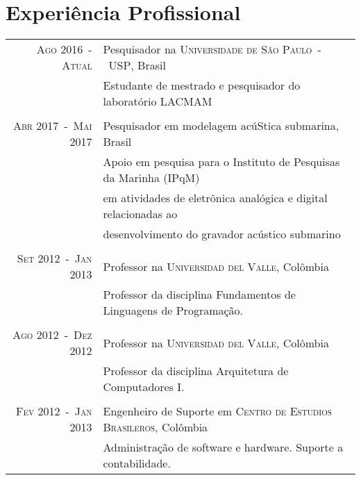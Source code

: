 \documentclass[a4paper,10pt]{article}
\begin{document}
\section{Experiência Profissional}
\begin{longtable}{rl}

    \textsc{Ago 2016~-~Atual}       & Pesquisador na \textsc{Universidade de São Paulo~-~USP}, Brasil \\
                                    &\footnotesize{Estudante de mestrado e pesquisador do laboratório LACMAM} \\
                                    &\\

    \textsc{Abr 2017~-~Mai 2017}    & Pesquisador em modelagem acúStica submarina, Brasil \\
                                    &\footnotesize{Apoio em pesquisa para o Instituto de Pesquisas da Marinha (IPqM)} \\
                                    &\footnotesize{em atividades de eletrônica analógica e digital relacionadas ao} \\
                                    &\footnotesize{desenvolvimento do gravador acústico submarino} \\
                                    &\\

    \textsc{Set 2012~-~Jan 2013}    & Professor na \textsc{Universidad del Valle}, Colômbia \\
                                    &\footnotesize{Professor da disciplina Fundamentos de Linguagens de Programação.} \\
                                    &\\

    \textsc{Ago 2012~-~Dez 2012}    & Professor na \textsc{Universidad del Valle}, Colômbia \\
                                    &\footnotesize{Professor da disciplina Arquitetura de Computadores I.} \\
                                    &\\

    \textsc{Fev 2012~-~Jan 2013}    & Engenheiro de Suporte em \textsc{Centro de Estudios Brasileros}, Colômbia \\
                                    &\footnotesize{Administração de software e hardware. Suporte a contabilidade.} \\
\end{longtable}
\end{document}
